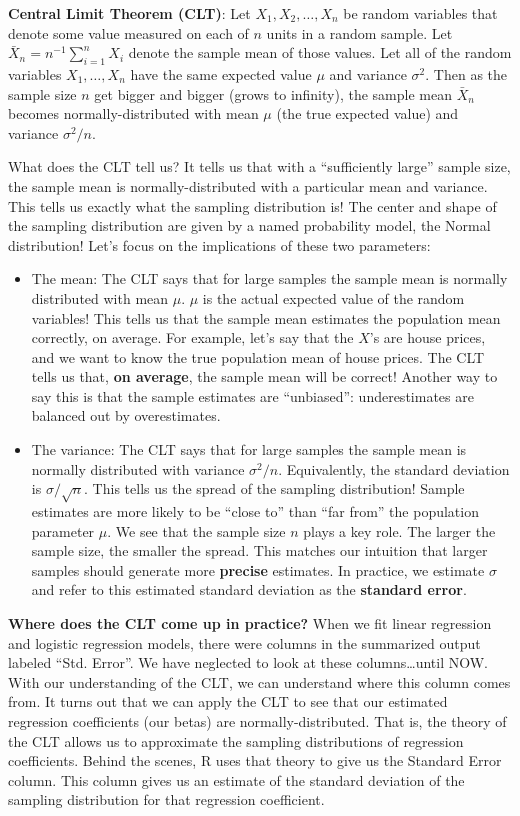 \documentclass[]{book}
\providecommand{\tightlist}{%
  \setlength{\itemsep}{0pt}\setlength{\parskip}{0pt}}
\begin{document}
\textbf{Central Limit Theorem (CLT)}: Let \(X_1, X_2, \ldots, X_n\) be random variables that denote some value measured on each of \(n\) units in a random sample. Let \(\bar{X}_n = n^{-1}\sum_{i=1}^n X_i\) denote the sample mean of those values. Let all of the random variables \(X_1, \ldots, X_n\) have the same expected value \(\mu\) and variance \(\sigma^2\). Then as the sample size \(n\) get bigger and bigger (grows to infinity), the sample mean \(\bar{X}_n\) becomes normally-distributed with mean \(\mu\) (the true expected value) and variance \(\sigma^2/n\).

What does the CLT tell us? It tells us that with a ``sufficiently large'' sample size, the sample mean is normally-distributed with a particular mean and variance. This tells us exactly what the sampling distribution is! The center and shape of the sampling distribution are given by a named probability model, the Normal distribution! Let's focus on the implications of these two parameters:

\begin{itemize}
\tightlist
\item
  The mean: The CLT says that for large samples the sample mean is normally distributed with mean \(\mu\). \(\mu\) is the actual expected value of the random variables! This tells us that the sample mean estimates the population mean correctly, on average. For example, let's say that the \(X\)'s are house prices, and we want to know the true population mean of house prices. The CLT tells us that, \textbf{on average}, the sample mean will be correct! Another way to say this is that the sample estimates are ``unbiased'': underestimates are balanced out by overestimates.
\item
  The variance: The CLT says that for large samples the sample mean is normally distributed with variance \(\sigma^2/n\). Equivalently, the standard deviation is \(\sigma/\sqrt{n}\). This tells us the spread of the sampling distribution! Sample estimates are more likely to be ``close to'' than ``far from'' the population parameter \(\mu\). We see that the sample size \(n\) plays a key role. The larger the sample size, the smaller the spread. This matches our intuition that larger samples should generate more \textbf{precise} estimates. In practice, we estimate \(\sigma\) and refer to this estimated standard deviation as the \textbf{standard error}.
\end{itemize}

\textbf{Where does the CLT come up in practice?} When we fit linear regression and logistic regression models, there were columns in the summarized output labeled ``Std. Error''. We have neglected to look at these columns\ldots{}until NOW. With our understanding of the CLT, we can understand where this column comes from. It turns out that we can apply the CLT to see that our estimated regression coefficients (our betas) are normally-distributed. That is, the theory of the CLT allows us to approximate the sampling distributions of regression coefficients. Behind the scenes, R uses that theory to give us the Standard Error column. This column gives us an estimate of the standard deviation of the sampling distribution for that regression coefficient.
\end{document}
